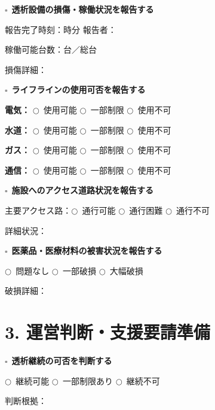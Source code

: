 \documentclass[a4paper,12pt]{jarticle}
\newcommand{\checkbox}{$\square$\ }
\newcommand{\underlinespace}[1]{\underline{\hspace{#1}}}
\newcommand{\circlecheck}{$\bigcirc$\ }
\begin{document}
\checkbox \textbf{透析設備の損傷・稼働状況を報告する}

\quad 報告完了時刻：\underlinespace{1cm}時\underlinespace{1cm}分 \quad 報告者：\underlinespace{4cm}

\quad 稼働可能台数：\underlinespace{2cm}台／総\underlinespace{2cm}台

\quad 損傷詳細：\underlinespace{10cm}

\vspace{4mm}

\checkbox \textbf{ライフラインの使用可否を報告する}

\quad \textbf{電気：} \circlecheck 使用可能 \circlecheck 一部制限 \circlecheck 使用不可

\quad \textbf{水道：} \circlecheck 使用可能 \circlecheck 一部制限 \circlecheck 使用不可

\quad \textbf{ガス：} \circlecheck 使用可能 \circlecheck 一部制限 \circlecheck 使用不可

\quad \textbf{通信：} \circlecheck 使用可能 \circlecheck 一部制限 \circlecheck 使用不可

\vspace{4mm}

\checkbox \textbf{施設へのアクセス道路状況を報告する}

\quad 主要アクセス路：\circlecheck 通行可能 \circlecheck 通行困難 \circlecheck 通行不可

\quad 詳細状況：\underlinespace{10cm}

\vspace{4mm}

\checkbox \textbf{医薬品・医療材料の被害状況を報告する}

\quad \circlecheck 問題なし \quad \circlecheck 一部破損 \quad \circlecheck 大幅破損

\quad 破損詳細：\underlinespace{10cm}

\vspace{5mm}

\newpage

\section*{3. 運営判断・支援要請準備}

\checkbox \textbf{透析継続の可否を判断する}

\quad \circlecheck 継続可能 \quad \circlecheck 一部制限あり \quad \circlecheck 継続不可

\quad 判断根拠：\underlinespace{10cm}

\vspace{4mm}
\end{document}
